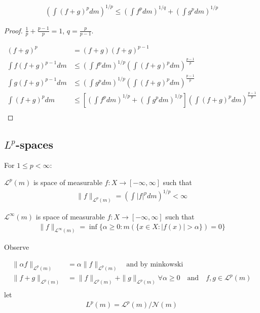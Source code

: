 \begin{corollary}
\begin{align*}
	\left( \int (f + g)^{p} dm \right)^{1/p} \leq \left( \int f^{p} dm \right)^{1/q} + \left( \int g^{p} dm \right)^{1/p}
\end{align*}
\end{corollary}

\begin{proof}
	$\frac{1}{p} + \frac{p-1}{p} = 1$, $q = \frac{p}{p-1}$.

	\begin{align*}
		(f + g)^{p} &= (f+g) ( f+g)^{p-1} \\
		\int f ( f + g)^{p-1} dm &\leq \left( \int f^{p} dm \right)^{1/p} \left( \int (f+g)^{p} dm \right)^{\frac{p-1}{p}} \\
		\int g ( f + g)^{p-1} dm &\leq \left( \int g^{p} dm \right)^{1/p} \left( \int (f+g)^{p} dm \right)^{\frac{p-1}{p}} \\
	\int ( f + g)^{p} dm &\leq \left[ \left( \int f^{p} dm \right)^{1/p} + \left( \int g^{p} dm \right)^{1/p} \right] \left( \int (f+g)^{p} dm \right)^{\frac{p-1}{p}} \\
	\end{align*}
\end{proof}

\subsection{\texorpdfstring{$L^{p}$-spaces}{Lp-spaces}}

\noindent For $1 \leq p < \infty$:

\noindent $\mathcal{L}^{p} (m)$ is space of measurable $f : X \to [-\infty, \infty]$ such that
 \begin{align*}
	\|f\|_{\mathcal{L}^{p} (m)} = \left( \int |f|^{p} dm \right)^{1/p} < \infty
\end{align*}



\noindent $\mathcal{L}^{\infty} (m)$ is space of measurable $f : X \to [-\infty, \infty]$ such that
 \begin{align*}
 \|f\|_{\mathcal{L}^{\infty} (m)} = \inf\{\alpha \geq 0 : m ( \{ x \in X : |f(x)| > \alpha \}) =0 \}
\end{align*}

Observe

\begin{align*}
	\|\alpha f\|_{\mathcal{L}^{p}(m)} &= \alpha \|f \|_{\mathcal{L}^{p} (m)} \quad \text{and by minkowski} \\
	\| f + g\|_{\mathcal{L}^{p}(m)} &=  \|f \|_{\mathcal{L}^{p} (m)} + \|g \|_{\mathcal{L}^{p} (m)}  \forall \alpha \geq 0 \quad \text{and} \quad f,g \in \mathcal{L}^{p} (m) \\
\end{align*}
 let
 \begin{align*}
 	L^{p} (m) = \mathcal{L}^{p} (m) / \mathscr{N} (m)
 \end{align*}



